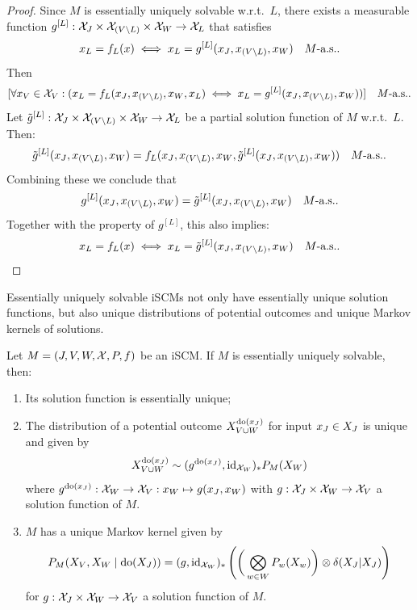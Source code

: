 \begin{proof}
  Since $M$ is essentially uniquely solvable w.r.t.\ $L$, there exists a measurable function $g^{[L]} : \mathcal{X}_J \times \mathcal{X}_{(V\setminus L)} \times \mathcal{X}_W \to \mathcal{X}_L$ that satisfies
    $$x_L = f_L(x) \iff x_L = g^{[L]}(x_J,x_{(V\setminus L)},x_W)\quad M\text{-a.s.}.$$
  Then
    $$[\forall x_V \in \mathcal{X}_V : (x_L = f_L(x_J,x_{(V\setminus L)},x_W,x_L) \iff x_L = g^{[L]}(x_J,x_{(V\setminus L)},x_W))]\quad M\text{-a.s.}.$$
  Let $\tilde{g}^{[L]} : \mathcal{X}_J \times \mathcal{X}_{(V\setminus L)} \times \mathcal{X}_W \to \mathcal{X}_L$ be a partial solution function of $M$ w.r.t.\ $L$.
  Then:
      $$\tilde{g}^{[L]}(x_J, x_{(V\setminus L)}, x_W) = f_L(x_J, x_{(V\setminus L)}, x_W, \tilde{g}^{[L]}(x_J, x_{(V\setminus L)}, x_W)) \quad M\text{-a.s.}.$$
  Combining these we conclude that
    $$g^{[L]}(x_J,x_{(V\setminus L)},x_W) = \tilde{g}^{[L]}(x_J,x_{(V\setminus L)},x_W) \quad M\text{-a.s.}.$$
  Together with the property of $g^{[L]}$, this also implies:
    $$x_L = f_L(x) \iff x_L = \tilde{g}^{[L]}(x_J,x_{(V\setminus L)},x_W)\quad M\text{-a.s.}.$$
\end{proof}
Essentially uniquely solvable iSCMs not only have essentially unique solution functions, but also unique distributions of potential outcomes and unique Markov kernels of solutions.
\begin{Thm}\label{thm:scm_essentially_unique_solvability_implies}
  Let $M = \left ( J, V, W, \mathcal{X}, P, f \right )$ be an iSCM.
  If $M$ is essentially uniquely solvable, then:
  \begin{enumerate}
    \item Its solution function is essentially unique;
    \item The distribution of a potential outcome $X^{\operatorname{do}(x_{J})}_{V\cup W}$ for input $x_{J}\in X_{J}$ is unique and given by 
      $$X_{V\cup W}^{\operatorname{do}(x_{J})} \sim (g^{\operatorname{do}(x_{J})},\mathrm{id}_{\mathcal{X}_{W}})_* P_M(X_W)$$
      where $g^{\operatorname{do}(x_{J})} : \mathcal{X}_{W} \to \mathcal{X}_{V} : x_{W} \mapsto g(x_J,x_{W})$ with $g : \mathcal{X}_{J} \times \mathcal{X}_{W} \to \mathcal{X}_{V}$ a solution function of $M$.
    \item $M$ has a unique Markov kernel given by
      $$P_{M}(X_{V},X_{W} \mid\operatorname{do}(X_{J})) = (g,\mathrm{id}_{\mathcal{X}_{W}})_* \left ( \bigg( \bigotimes_{w\in W} P_w(X_w) \bigg) \otimes \delta(X_J|X_J) \right )$$
      for $g : \mathcal{X}_{J} \times \mathcal{X}_{W} \to \mathcal{X}_{V}$ a solution function of $M$.
  \end{enumerate}
\end{Thm}
